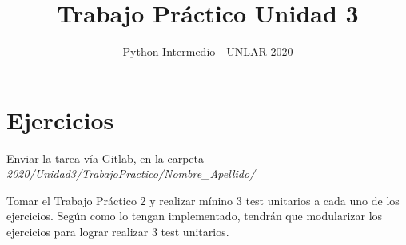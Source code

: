 \documentclass[12pt, spanish]{article}
\title{Trabajo Práctico Unidad 3}
\author{Python Intermedio - UNLAR 2020}
\begin{document}
\maketitle

\section{Ejercicios}

Enviar la tarea vía Gitlab, en la carpeta
\textit{2020/Unidad3/TrabajoPractico/Nombre\_Apellido/}

Tomar el Trabajo Práctico 2 y realizar mínino 3 test unitarios a cada uno de los ejercicios.
Según como lo tengan implementado, tendrán que modularizar los ejercicios para lograr realizar
3 test unitarios.
\end{document}

